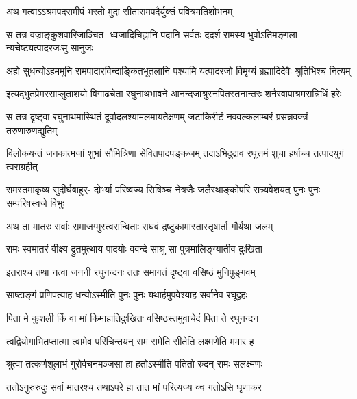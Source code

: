 



\twolineshloka
{अथ गत्वाऽऽश्रमपदसमीपं भरतो मुदा}
{सीतारामपदैर्युक्तं पवित्रमतिशोभनम्} %

\fourlineindentedshloka
{स तत्र वज्राङ्कुशवारिजाञ्चित-}
{ध्वजादिचिह्नानि पदानि सर्वतः}
{ददर्श रामस्य भुवोऽतिमङ्गला-}
{न्यचेष्टयत्पादरजःसु सानुजः} %

\fourlineindentedshloka
{अहो सुधन्योऽहममूनि}
{रामपादारविन्दाङ्कितभूतलानि}
{पश्यामि यत्पादरजो विमृग्यं}
{ब्रह्मादिदेवैः श्रुतिभिश्च नित्यम्} %

\fourlineindentedshloka
{इत्यद्भुतप्रेमरसाप्लुताशयो}
{विगाढचेता रघुनाथभावने}
{आनन्दजाश्रुस्नपितस्तनान्तरः}
{शनैरवापाश्रमसन्निधिं हरेः} %

\fourlineindentedshloka
{स तत्र दृष्ट्वा रघुनाथमास्थितं}
{दूर्वादलश्यामलमायतेक्षणम्}
{जटाकिरीटं नववल्कलाम्बरं}
{प्रसन्नवक्त्रं तरुणारुणद्युतिम्} %

\fourlineindentedshloka
{विलोकयन्तं जनकात्मजां शुभां}
{सौमित्रिणा सेवितपादपङ्कजम्}
{तदाऽभिदुद्राव रघूत्तमं शुचा}
{हर्षाच्च तत्पादयुगं त्वराग्रहीत्} %

\fourlineindentedshloka
{रामस्तमाकृष्य सुदीर्घबाहुर्-}
{दोर्भ्यां परिष्वज्य सिषिञ्च नेत्रजैः}
{जलैरथाङ्कोपरि सन्न्यवेशयत्}
{पुनः पुनः सम्परिषस्वजे विभुः} %

\twolineshloka
{अथ ता मातरः सर्वाः समाजग्मुस्त्वरान्विताः}
{राघवं द्रष्टुकामास्तास्तृषार्ता गौर्यथा जलम्} %

\twolineshloka
{रामः स्वमातरं वीक्ष्य द्रुतमुत्थाय पादयोः}
{ववन्दे साश्रु सा पुत्रमालिङ्ग्यातीव दुःखिता} %

\twolineshloka
{इतराश्च तथा नत्वा जननी रघुनन्दनः}
{ततः समागतं दृष्ट्वा वसिष्ठं मुनिपुङ्गवम्} %

\twolineshloka
{साष्टाङ्गं प्रणिपत्याह धन्योऽस्मीति पुनः पुनः}
{यथार्हमुपवेश्याह सर्वानेव रघूद्वहः} %

\twolineshloka
{पिता मे कुशली किं वा मां किमाहातिदुःखितः}
{वसिष्ठस्तमुवाचेदं पिता ते रघुनन्दन} %

\twolineshloka
{त्वद्वियोगाभितप्तात्मा त्वामेव परिचिन्तयन्}
{राम रामेति सीतेति लक्ष्मणेति ममार ह} %

\twolineshloka
{श्रुत्वा तत्कर्णशूलाभं गुरोर्वचनमञ्जसा}
{हा हतोऽस्मीति पतितो रुदन् रामः सलक्ष्मणः} %

\twolineshloka
{ततोऽनुरुरुदुः सर्वा मातरश्च तथाऽपरे}
{हा तात मां परित्यज्य क्व गतोऽसि घृणाकर} %

